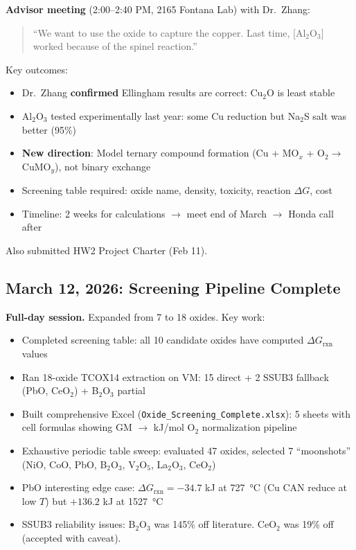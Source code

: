 \documentclass[11pt]{article}
\begin{document}
\textbf{Advisor meeting} (2:00--2:40 PM, 2165 Fontana Lab) with Dr.\ Zhang:

\begin{quote}
``We want to use the oxide to capture the copper. Last time, [Al$_2$O$_3$] worked because of the spinel reaction.''
\end{quote}

Key outcomes:
\begin{itemize}[leftmargin=*]
    \item Dr.\ Zhang \textbf{confirmed} Ellingham results are correct: Cu$_2$O is least stable
    \item Al$_2$O$_3$ tested experimentally last year: some Cu reduction but Na$_2$S salt was better (95\%)
    \item \textbf{New direction}: Model ternary compound formation (Cu + MO$_x$ + O$_2 \to$ CuMO$_y$), not binary exchange
    \item Screening table required: oxide name, density, toxicity, reaction $\Delta G$, cost
    \item Timeline: 2 weeks for calculations $\to$ meet end of March $\to$ Honda call after
\end{itemize}

Also submitted HW2 Project Charter (Feb 11).

\subsection{March 12, 2026: Screening Pipeline Complete}

\textbf{Full-day session.} Expanded from 7 to 18 oxides. Key work:

\begin{itemize}[leftmargin=*]
    \item Completed screening table: all 10 candidate oxides have computed $\Delta G_{\text{rxn}}$ values
    \item Ran 18-oxide TCOX14 extraction on VM: 15 direct + 2 SSUB3 fallback (PbO, CeO$_2$) + B$_2$O$_3$ partial
    \item Built comprehensive Excel (\texttt{Oxide\_Screening\_Complete.xlsx}): 5 sheets with cell formulas showing GM $\to$ kJ/mol O$_2$ normalization pipeline
    \item Exhaustive periodic table sweep: evaluated 47 oxides, selected 7 ``moonshots'' (NiO, CoO, PbO, B$_2$O$_3$, V$_2$O$_5$, La$_2$O$_3$, CeO$_2$)
    \item PbO interesting edge case: $\Delta G_{\text{rxn}} = -34.7$ kJ at \SI{727}{\celsius} (Cu CAN reduce at low $T$) but $+136.2$ kJ at \SI{1527}{\celsius}
    \item SSUB3 reliability issues: B$_2$O$_3$ was 145\% off literature. CeO$_2$ was 19\% off (accepted with caveat).
\end{itemize}
\end{document}
